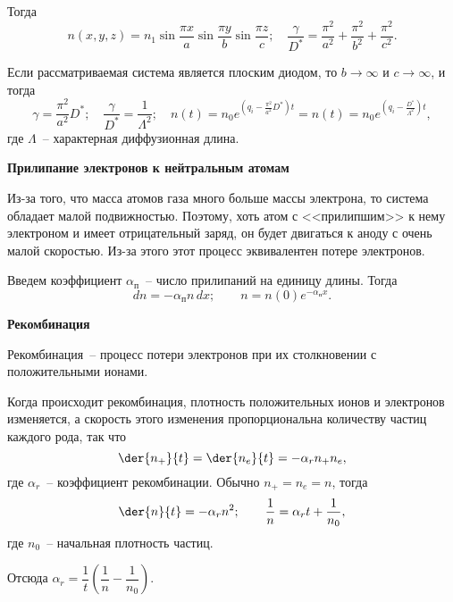 Тогда
\[
  n(x, y, z) = n_1\sin\frac{\pi x}{a} \sin\frac{\pi y}{b} \sin\frac{\pi z}{c};
    \quad \frac{\gamma}{D^*} = \frac{\pi^2}{a^2} + \frac{\pi^2}{b^2} +
    \frac{\pi^2}{c^2}.
\]

Если рассматриваемая система является плоским диодом, то \( b\to\infty \) и
\( c\to\infty \), и тогда
\[
  \gamma = \frac{\pi^2}{a^2}D^*; \quad
    \frac{\gamma}{D^*} = \frac{1}{\Lambda^2}; \quad
    n(t) = n_0 e^{\left( q_i - \frac{\pi^2}{a^2}D^* \right)t} =
    n(t) = n_0 e^{\left( q_i - \frac{D^*}{\Lambda^2} \right)t},
\]
где \( \Lambda \)~-- характерная диффузионная длина.

\hspace{1em}\textbf{Прилипание электронов к нейтральным атомам}

Из-за того, что масса атомов газа много больше массы электрона, то система
обладает малой подвижностью. Поэтому, хоть атом с <<прилипшим>> к нему
электроном и имеет отрицательный заряд, он будет двигаться к аноду с очень малой
скоростью. Из-за этого этот процесс эквивалентен потере электронов.

Введем коэффициент \( \alpha_\text{п} \)~-- число прилипаний на единицу длины.
Тогда
\[
  dn = -\alpha_\text{п}n\,dx; \qquad n = n(0)e^{-\alpha_\text{п}x}.
\]

\hspace{1em}\textbf{Рекомбинация}

Рекомбинация~-- процесс потери электронов при их столкновении с положительными
ионами.

Когда происходит рекомбинация, плотность положительных ионов и электронов
изменяется, а скорость этого изменения пропорциональна количеству частиц каждого
рода, так что
\[
  \der{n_+}{t} = \der{n_e}{t} = -\alpha_r n_+ n_e,
\]
где \( \alpha_r \)~-- коэффициент рекомбинации. Обычно \( n_+ = n_e = n \),
тогда
\[
  \der{n}{t} = -\alpha_r n^2; \qquad
    \frac{1}{n} = \alpha_r t + \frac{1}{n_0},
\]
где \( n_0 \)~-- начальная плотность частиц.

Отсюда
\(
  \alpha_r = \dfrac{1}{t} \left( \dfrac{1}{n} - \dfrac{1}{n_0} \right)
\).
